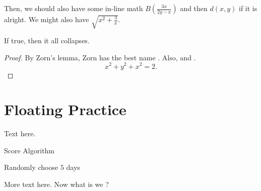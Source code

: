 Then, we should also have some in-line math $B\left(\frac{3x}{2y-x}\right)$ and then $d(x,y)$ if it is alright. We might also have $\sqrt{x^2+\frac{3}{x}}$.

\begin{theorem}
    If true, then it all collapses.
\end{theorem}
\begin{proof}
    By Zorn's lemma, Zorn has the best name \autocite{martiniCompleteReducedConvex2019}.
    Also, \autocite{chenGraphHomotopyGraham2001} and \autocite{dochtermannMinimalGraphsContractible2023}.
    \[x^2+y^2+x^2=2.\]

\end{proof}
\section{Floating Practice}
Text here.

\begin{algorithm}
    \caption{Score Algorithm}
    \begin{algorithmic}[1]
        \Statex
        \State Randomly choose $5$ days
        \EndFor
        \EndFor
    \end{algorithmic}
\end{algorithm}

More text here. Now what is we ?

\printbibliography[heading=subbibnumbered]

